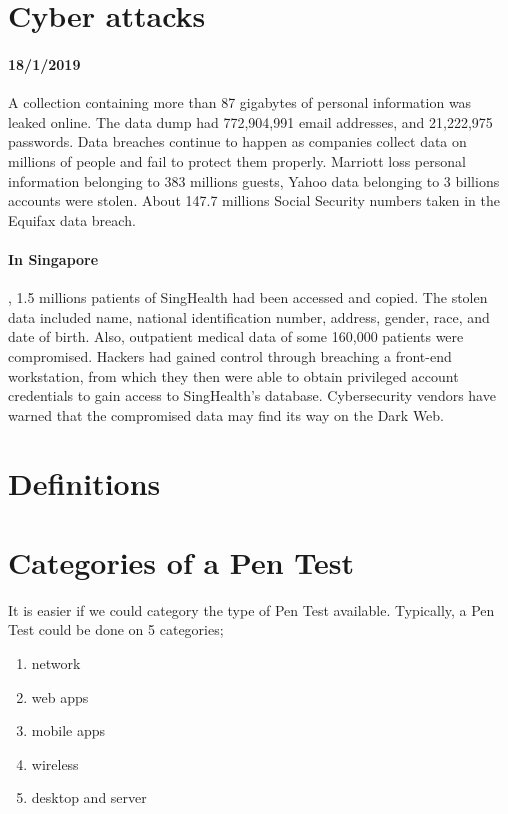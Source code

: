 \documentclass[7x9]{times}
\begin{document}
\section{Cyber attacks}

\paragraph{18/1/2019} A collection containing more than 87 gigabytes of 
personal information was leaked online. The data dump had 772,904,991 email 
addresses, and 21,222,975 passwords. Data breaches continue to happen as 
companies collect data on millions of people and fail to protect them properly. 
Marriott loss personal information belonging to 383 millions guests, Yahoo data 
belonging to 3 billions accounts were stolen. About 147.7 millions Social 
Security numbers taken in the Equifax data breach.

\paragraph{In Singapore}, 1.5 millions patients of SingHealth had been accessed 
and copied. The stolen data included name, national identification number, 
address, gender, race, and date of birth. Also, outpatient medical data of some 
160,000 patients were compromised. Hackers had gained control through 
breaching a front-end workstation, from which they then were able to obtain 
privileged account credentials to gain access to SingHealth's database. 
Cybersecurity vendors have warned that the compromised data may find its way on 
the Dark Web.


\section{Definitions}



\section{Categories of a Pen Test}

It is easier if we could category the type of Pen Test available. Typically, 
a Pen Test could be done on 5 categories;
\begin{enumerate}
    \item network
    \item web apps
    \item mobile apps
    \item wireless
    \item desktop and server
\end{enumerate}
\end{document}
